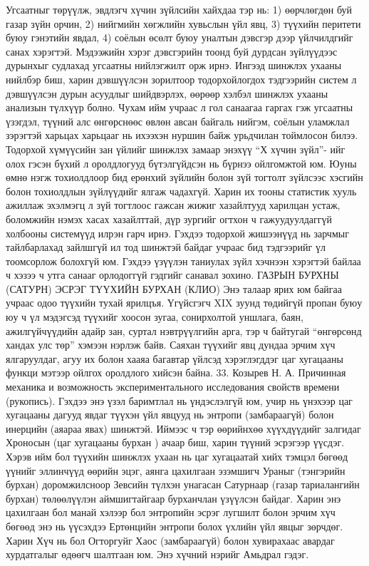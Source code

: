 Угсаатныг төрүүлж, эвдлэгч хүчин зүйлсийн хайхдаа тэр нь: 1) өөрчлөгдөн буй газар зүйн орчин, 2) нийгмийн хөгжлийн хувьслын үйл явц, 3) түүхийн перитети буюу гэнэтийн явдал, 4) соёлын өсөлт буюу уналтын дэвсгэр дээр үйлчилдгийг санах хэрэгтэй. Мэдээжийн хэрэг дэвсгэрийн тоонд буй дурдсан зүйлүүдээс дурынхыг судлахад угсаатны нийлэгжилт орж ирнэ. Ингээд шинжлэх ухааны нийлбэр биш, харин дэвшүүлсэн зорилтоор тодорхойлогдох тэдгээрийн систем л дэвшүүлсэн дурын асуудлыг шийдвэрлэх, өөрөөр хэлбэл шинжлэх ухааны анализын түлхүүр болно. Чухам ийм учраас л гол санаагаа гаргах гэж угсаатны үзэгдэл, түүний алс өнгөрснөөс өвлөн авсан байгаль нийгэм, соёлын уламжлал зэрэгтэй харьцах харьцааг нь ихээхэн нуршин байж урьдчилан тоймлосон билээ.
Тодорхой хүмүүсийн зан үйлийг шинжлэх замаар энэхүү “Х хүчин зүйл”- ийг олох гэсэн бүхий л оролдлогууд бүтэлгүйдсэн нь бүрнээ ойлгомжтой юм. Юуны өмнө нэгж тохиолдлоор бид ерөнхий зүйлийн болон зүй тогтолт зүйлсээс хэсгийн болон тохиолдлын зүйлүүдийг ялгаж чадахгүй. Харин их тооны статистик хууль ажиллаж эхэлмэгц л зүй тогтлоос гажсан жижиг хазайлтууд харилцан устаж, боломжийн нэмэх хасах хазайлттай, дүр зургийг огтхон ч гажуудуулдаггүй холбооны системүүд илрэн гарч ирнэ. Гэхдээ тодорхой жишээнүүд нь зарчмыг тайлбарлахад зайлшгүй ил тод шинжтэй байдаг учраас бид тэдгээрийг үл тоомсорлож болохгүй юм. Гэхдээ үзүүлэн таниулах зүйл хэчнээн хэрэгтэй байлаа ч хэзээ ч утга санааг орлодоггүй гэдгийг санавал зохино.
ГАЗРЫН БУРХНЫ (САТУРН) ЭСРЭГ ТҮҮХИЙН БУРХАН (КЛИО)
Энэ талаар ярих юм байгаа учраас одоо түүхийн тухай ярилцъя. Үгүйсгэгч XIX зуунд төдийгүй пропан буюу юу ч үл мэдэгсэд түүхийг хоосон зугаа, сонирхолтой уншлага, баян, ажилгүйчүүдийн адайр зан, суртал нэвтрүүлгийн арга, тэр ч байтугай “өнгөрсөнд хандах улс төр” хэмээн нэрлэж байв. Саяхан түүхийг явц дундаа эрчим хүч ялгаруулдаг, агуу их болон хааяа багавтар үйлсэд хэрэглэгддэг цаг хугацааны функци мэтээр ойлгох оролдлого хийсэн байна. 33. Козырев Н. А. Причинная механика и возможность экспериментального исследования свойств времени (рукопись).
Гэхдээ энэ үзэл баримтлал нь үндэслэлгүй юм, учир нь үнэхээр цаг хугацааны дагууд явдаг түүхэн үйл явцууд нь энтропи (замбараагүй) болон инерцийн (аяараа явах) шинжтэй. Иймээс ч тэр өөрийнхөө хүүхдүүдийг залгидаг Хроносын (цаг хугацааны бурхан ) ачаар биш, харин түүний эсрэгээр үүсдэг.
Хэрэв ийм бол түүхийн шинжлэх ухаан нь цаг хугацаатай хийх тэмцэл бөгөөд үүнийг эллинчүүд өөрийн эцэг, аянга цахилгаан эзэмшигч Ураныг (тэнгэрийн бурхан) доромжилсноор Зевсийн түлхэн унагасан Сатурнаар (газар тариалангийн бурхан) төлөөлүүлэн аймшигтайгаар бурханчлан үзүүлсэн байдаг. Харин энэ цахилгаан бол манай хэлээр бол энтропийн эсрэг лугшилт болон эрчим хүч бөгөөд энэ нь үүсэхдээ Ертөнцийн энтропи болох үхлийн үйл явцыг зөрчдөг. Харин Хүч нь бол Огторгуйг Хаос (замбараагүй) болон хувирахаас авардаг хурдатгалыг өдөөгч шалтгаан юм. Энэ хүчний нэрийг Амьдрал гэдэг.
